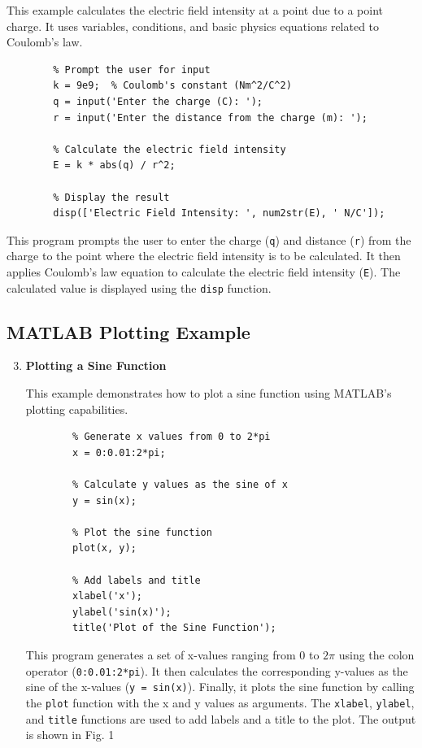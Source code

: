 \documentclass[
11pt, %
a4paper, %
oneside, %
headinclude,footinclude, %
BCOR5mm, %
]{scrartcl}
\begin{document}
\begin{enumerate}
	This example calculates the electric field intensity at a point due to a point charge. It uses variables, conditions, and basic physics equations related to Coulomb's law.
	
	\begin{verbatim}
		% Prompt the user for input
		k = 9e9;  % Coulomb's constant (Nm^2/C^2)
		q = input('Enter the charge (C): ');
		r = input('Enter the distance from the charge (m): ');
		
		% Calculate the electric field intensity
		E = k * abs(q) / r^2;
		
		% Display the result
		disp(['Electric Field Intensity: ', num2str(E), ' N/C']);
	\end{verbatim}
	
	This program prompts the user to enter the charge (\texttt{q}) and distance (\texttt{r}) from the charge to the point where the electric field intensity is to be calculated. It then applies Coulomb's law equation to calculate the electric field intensity (\texttt{E}). The calculated value is displayed using the \texttt{disp} function.
	
\end{enumerate}

\subsection{MATLAB Plotting Example}

\begin{enumerate}
	\setcounter{enumi}{2}
	
	\item \textbf{Plotting a Sine Function}
	
	This example demonstrates how to plot a sine function using MATLAB's plotting capabilities.
	
	\begin{verbatim}
		% Generate x values from 0 to 2*pi
		x = 0:0.01:2*pi;
		
		% Calculate y values as the sine of x
		y = sin(x);
		
		% Plot the sine function
		plot(x, y);
		
		% Add labels and title
		xlabel('x');
		ylabel('sin(x)');
		title('Plot of the Sine Function');
	\end{verbatim}
	
	This program generates a set of x-values ranging from 0 to $2\pi$ using the colon operator (\texttt{0:0.01:2*pi}). It then calculates the corresponding y-values as the sine of the x-values (\texttt{y = sin(x)}). Finally, it plots the sine function by calling the \texttt{plot} function with the x and y values as arguments. The \texttt{xlabel}, \texttt{ylabel}, and \texttt{title} functions are used to add labels and a title to the plot. The output is shown in Fig. 1
	
\end{enumerate}
\end{document}
